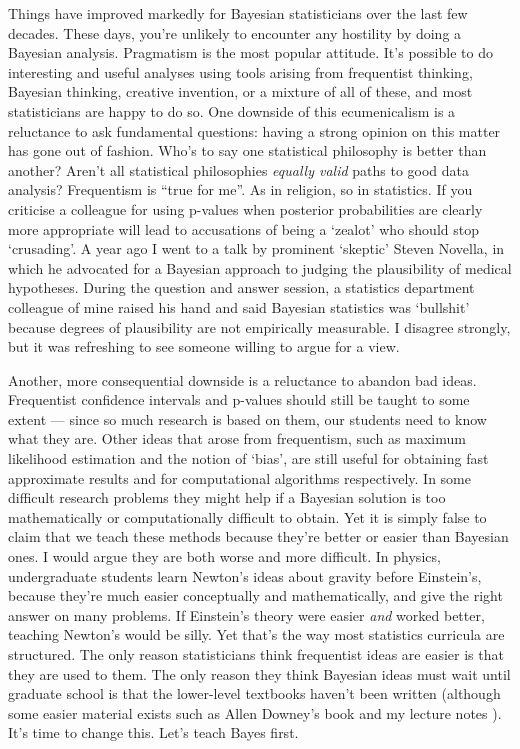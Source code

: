 \documentclass[a4paper, 12pt]{article}
\begin{document}
Things have improved markedly for Bayesian statisticians over the last few
decades. These days, you're unlikely to encounter any hostility by doing
a Bayesian analysis. Pragmatism is the most popular attitude.
It's possible to do interesting and useful analyses using tools
arising from frequentist thinking, Bayesian thinking, creative invention, or
a mixture of all of these, and most statisticians are happy to do so.
One downside of this ecumenicalism is a reluctance to ask fundamental
questions: having a strong opinion on this matter has gone out of fashion.
Who's to say one statistical philosophy is better than
another? Aren't all statistical philosophies {\it equally valid} paths to good
data analysis? Frequentism is ``true for me''. As in religion, so in statistics.
If you criticise a colleague for using p-values when posterior probabilities
are clearly more appropriate will lead to accusations of being a `zealot'
\citep{simply_statistics} who should stop `crusading'.
A year ago I went to a talk by prominent `skeptic' Steven Novella, in which
he advocated for a Bayesian approach to judging the plausibility of medical
hypotheses. During the question and answer session, a statistics department colleague of mine raised his hand and said Bayesian statistics was `bullshit' because degrees of plausibility are not empirically measurable. I disagree
strongly, but it was refreshing to see someone willing to argue for a view.

Another, more consequential downside is a reluctance to abandon bad ideas.
Frequentist confidence intervals and p-values should still be taught to some
extent --- since so much research is based on them, our students need to know what
they are. Other ideas that arose from frequentism, such as maximum likelihood
estimation and the notion of `bias', are still useful for obtaining fast
approximate results and for computational algorithms respectively.
In some difficult research problems they might help if a Bayesian solution is too mathematically or computationally difficult to obtain.
Yet it is simply false to claim that we teach these methods because they're
better or easier than Bayesian ones. I would argue they are both worse and
more difficult. In physics, undergraduate students learn Newton's ideas about
gravity before Einstein's, because they're much easier conceptually and
mathematically, and give the right answer on many problems. If Einstein's theory
were easier {\em and} worked better, teaching Newton's would be silly. Yet
that's the way most statistics curricula are structured.
The only reason
statisticians think frequentist ideas are easier is that they are used to them.
The only reason they think Bayesian ideas must wait until graduate school is
that the lower-level textbooks haven't been written (although some easier material
exists such as Allen Downey's book \citep{downey} and my lecture
notes \citep{331}). It's time to change this. Let's teach Bayes first.
\end{document}
